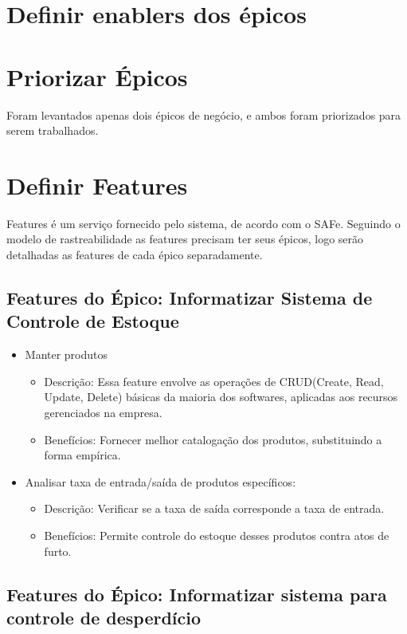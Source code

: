 \section{Definir enablers dos épicos}

\section{Priorizar Épicos}
Foram levantados apenas dois épicos de negócio, e ambos foram priorizados para serem trabalhados.

\section{Definir Features}
Features é um serviço fornecido pelo sistema, de acordo com o SAFe. Seguindo o modelo de rastreabilidade as features precisam ter seus épicos, logo serão detalhadas as features de cada épico separadamente.

\subsection{Features do Épico: Informatizar Sistema de Controle de Estoque}

\begin{itemize}
\item Manter produtos
\begin{itemize}
\item Descrição: Essa feature envolve as operações de CRUD(Create, Read, Update, Delete) básicas da maioria dos softwares, aplicadas aos recursos gerenciados na empresa.
\item Benefícios: Fornecer melhor catalogação dos produtos, substituindo a forma empírica.
\end{itemize}

\item Analisar taxa de entrada/saída de produtos específicos:
\begin{itemize}
	\item Descrição: Verificar se a taxa de saída corresponde a taxa de entrada.
	\item Benefícios: Permite controle do estoque desses produtos contra atos de furto.
\end{itemize}

\end{itemize}	

\subsection{Features do Épico: Informatizar sistema para controle de desperdício}

